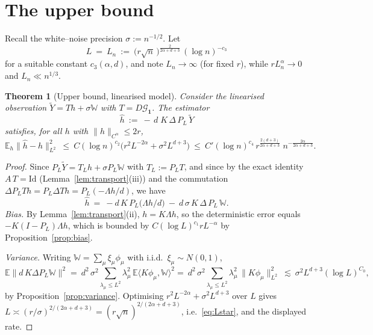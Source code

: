 \documentclass[11pt]{article}
\newtheorem{theorem}{Theorem}[section]
\newcommand{\E}{\mathbb{E}}
\newcommand{\W}{\mathbb{W}}
\newcommand{\1}{\mathbf{1}}
\newcommand{\norm}[1]{\lVert #1\rVert}
\newcommand{\inner}[2]{\langle #1,#2\rangle}
\newcommand{\Gf}{\mathcal{G}}
\begin{document}
\section{The upper bound}\label{sec:upper}

Recall the white--noise precision $\sigma:=n^{-1/2}$. Let
\begin{equation}\label{eq:Lstar}
L\ =\ L_n\ :=\ \big(r\sqrt n\,\big)^{\frac{2}{2\alpha+d+3}}\,(\log n)^{-c_3}
\end{equation}
for a suitable constant $c_3(\alpha,d)$, and note $L_n\to\infty$ (for fixed $r$),
while $r L_n^\alpha\to0$ and $L_n\ll n^{1/3}$.

\begin{theorem}[Upper bound, linearised model]\label{thm:upperlin}
Consider the linearised observation $\tilde Y=T h+\sigma \W$ with
$T=D\Gf_{\1}$. The estimator
\begin{equation}\label{eq:estimator}
\hat h\ :=\ -\,d\;K\,\Delta\,P_L\,\tilde Y
\end{equation}
satisfies, for all $h$ with $\norm h_{C^\alpha}\le 2r$,
\[
\E_h\norm{\hat h-h}_{L^2}^2\ \le\ C(\log n)^{c_2}\Big(r^2L^{-2\alpha}+\sigma^2 L^{d+3}\Big)
\ \le\ C'(\log n)^{c_4}\,r^{\frac{2(d+3)}{2\alpha+d+3}}\;n^{-\frac{2\alpha}{2\alpha+d+3}} .
\]
\end{theorem}

\begin{proof}
Since $P_L\tilde Y=T_Lh+\sigma P_L\W$ with $T_L:=P_LT$, and since by the exact identity
$A\,T=\mathrm{Id}$ (Lemma~\ref{lem:transport}(iii)) and the commutation
$\Delta P_LT h=P_L\Delta T h=P_L(-\Lambda h/d)$, we have
\[
\hat h\ =\ -d\,K\,P_L\big(\Lambda h/d\big)\ -\ d\,\sigma\,K\,\Delta\,P_L\,\W .
\]
\emph{Bias.} By Lemma~\ref{lem:transport}(ii), $h=K\Lambda h$, so the deterministic
error equals $-K(I-P_L)\Lambda h$, which is bounded by
$C(\log L)^{c_1}rL^{-\alpha}$ by Proposition~\ref{prop:bias}.

\emph{Variance.} Writing $\W=\sum_\mu\xi_\mu\phi_\mu$ with i.i.d.\ $\xi_\mu\sim N(0,1)$,
\[
\E\big\|d\,K\Delta P_L\W\big\|^2
=\ d^2\,\sigma^2\sum_{\lambda_\mu\le L^2}\lambda_\mu^2\,\E\inner{K\phi_\mu}{\W}^{\!\!2}
=\ d^2\,\sigma^2\sum_{\lambda_\mu\le L^2}\lambda_\mu^2\,\norm{K\phi_\mu}_{L^2}^2
\ \lesssim\ \sigma^2 L^{d+3}(\log L)^{C_0},
\]
by Proposition~\ref{prop:variance}. Optimising $r^2L^{-2\alpha}+\sigma^2L^{d+3}$ over
$L$ gives $L\asymp(r/\sigma)^{2/(2\alpha+d+3)}=(r\sqrt n)^{2/(2\alpha+d+3)}$, i.e.\
\eqref{eq:Lstar}, and the displayed rate.
\end{proof}
\end{document}
